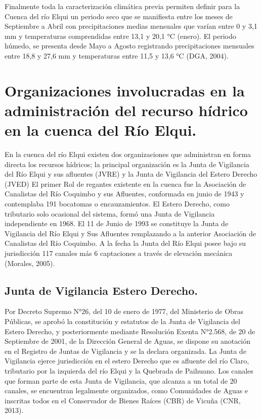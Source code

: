 \documentclass[10pt,]{article}
\begin{document}
Finalmente toda la caracterización climática previa permiten definir para la Cuenca del río Elqui un  periodo seco que se manifiesta entre los meses de Septiembre a Abril con precipitaciones medias mensuales que varían entre 0 y 3,1 mm y temperaturas comprendidas entre 13,1 y 20,1 °C (enero). El periodo húmedo, se presenta desde Mayo a Agosto registrando precipitaciones mensuales entre 18,8 y 27,6 mm y temperaturas entre 11,5 y 13,6 °C (DGA, 2004).

\section{Organizaciones involucradas en la administración del recurso hídrico en la cuenca del Río Elqui.}
En la cuenca del río Elqui existen dos organizaciones que administran en forma directa los recursos hídricos; la principal organización es la Junta de Vigilancia del Río Elqui y sus afluentes (JVRE) y la Junta de Vigilancia del Estero Derecho (JVED)
El primer Rol de regantes existente en la cuenca fue la Asociación de Canalistas del Río Coquimbo y sus Afluentes, conformada en junio de 1943 y contemplaba 191 bocatomas o encauzamientos.  El Estero Derecho, como tributario solo ocasional del sistema, formó una Junta de Vigilancia independiente en 1968. El 11 de Junio de 1993 se constituye la Junta de Vigilancia del Río Elqui y Sus Afluentes remplazando a la anterior Asociación de Canalistas del Río Coquimbo. A la fecha la Junta del Río Elqui posee bajo su jurisdicción 117 canales más 6 captaciones a través de elevación mecánica (Morales, 2005).

\subsection{Junta de Vigilancia Estero Derecho.}
Por Decreto Supremo N°26, del 10 de enero de 1977, del Ministerio de Obras Públicas, se aprobó la constitución y estatutos de la Junta de Vigilancia del Estero Derecho, y posteriormente mediante Resolución Exenta N°2.568, de 20 de Septiembre de 2001, de la Dirección General de Aguas, se dispone su anotación en el Registro de Juntas de Vigilancia y se la declara organizada.
La Junta de Vigilancia ejerce jurisdicción en el estero Derecho que es afluente del río Claro, tributario por la izquierda del río Elqui y la Quebrada de Paihuano. 
Los canales que forman parte de esta Junta de Vigilancia, que alcanza a un total de 20 canales, se encuentran legalmente organizados, como Comunidades de Aguas e inscritas todos en el Conservador de Bienes Raíces (CBR) de Vicuña (CNR, 2013).
\end{document}
